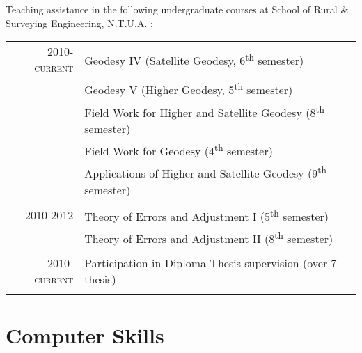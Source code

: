 \documentclass[a4paper,10pt]{article} %
\begin{document}
Teaching assistance in the following undergraduate courses at School of Rural \& Surveying Engineering, N.T.U.A. :

\begin{longtable}{rl}

\textsc{2010-current} & 
  Geodesy IV (Satellite Geodesy, 6\textsuperscript{th} semester)\\
  & Geodesy V (Higher Geodesy, 5\textsuperscript{th} semester)\\
  & Field Work for Higher and Satellite Geodesy (8\textsuperscript{th} semester)\\
  & Field Work for Geodesy (4\textsuperscript{th} semester)\\
  & Applications of Higher and Satellite Geodesy (9\textsuperscript{th} semester)\\
&\\

\textsc{2010-2012} & 
  Theory of Errors and Adjustment I (5\textsuperscript{th} semester)\\
  & Theory of Errors and Adjustment II (8\textsuperscript{th} semester)\\
&\\

\textsc{2010-current} & 
  Participation in Diploma Thesis supervision (over 7 thesis)\\
&\\

\end{longtable}
\medskip

\section{Computer Skills}
\end{document}
